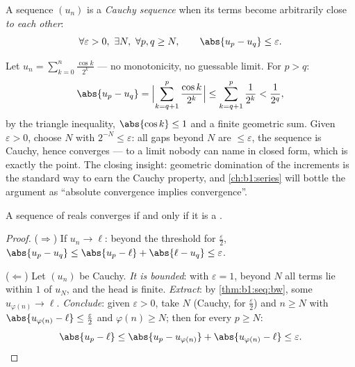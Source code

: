 \begin{definition}\label{def:b1:seq:cauchy}
A sequence $(u_n)$ is a \emph{Cauchy sequence}
when its terms become arbitrarily close \emph{to each other}:
\[
\forall \varepsilon > 0,\ \exists N,\ \forall p, q \geq N,
\qquad \abs{u_p - u_q} \leq \varepsilon .
\]
\end{definition}

\begin{example}\label{ex:b1:seq:cauchyhand}
Let $u_n = \sum_{k=0}^{n} \frac{\cos k}{2^k}$ --- no monotonicity,
no guessable limit. For $p > q$:
\[
\abs{u_p - u_q}
= \Bigl| \sum_{k=q+1}^{p} \frac{\cos k}{2^k} \Bigr|
\leq \sum_{k=q+1}^{p} \frac{1}{2^k}
< \frac{1}{2^{q}} ,
\]
by the triangle inequality, $\abs{\cos k} \leq 1$ and a finite
geometric sum. Given $\varepsilon > 0$, choose $N$ with $2^{-N}
\leq \varepsilon$: all gaps beyond $N$ are $\leq \varepsilon$,
the sequence is Cauchy, hence converges --- to a limit nobody
can name in closed form, which is exactly the point. The closing
insight: geometric domination of the increments is the standard
way to earn the Cauchy property, and \cref{ch:b1:series} will
bottle the argument as ``absolute convergence implies
convergence''.
\end{example}

\begin{theorem}[Completeness of $\R$]\label{thm:b1:seq:complete}
A sequence of reals converges if and only if it is a .
\end{theorem}

\begin{proof}
($\Rightarrow$) If $u_n \to \ell$: beyond the threshold for
$\frac\varepsilon2$, $\abs{u_p - u_q} \leq \abs{u_p - \ell} +
\abs{\ell - u_q} \leq \varepsilon$.

($\Leftarrow$) Let $(u_n)$ be Cauchy. \emph{It is bounded}: with
$\varepsilon = 1$, beyond $N$ all terms lie within $1$ of $u_N$, and
the head is finite. \emph{Extract}: by
\cref{thm:b1:seq:bw}, some  $u_{\varphi(n)} \to \ell$.
\emph{Conclude}: given $\varepsilon > 0$, take $N$ (Cauchy, for
$\frac\varepsilon2$) and $n \geq N$ with $\abs{u_{\varphi(n)} - \ell}
\leq \frac\varepsilon2$ and $\varphi(n) \geq N$; then for every $p
\geq N$:
\[
\abs{u_p - \ell} \leq \abs{u_p - u_{\varphi(n)}} +
\abs{u_{\varphi(n)} - \ell} \leq \varepsilon . \qedhere
\]
\end{proof}

